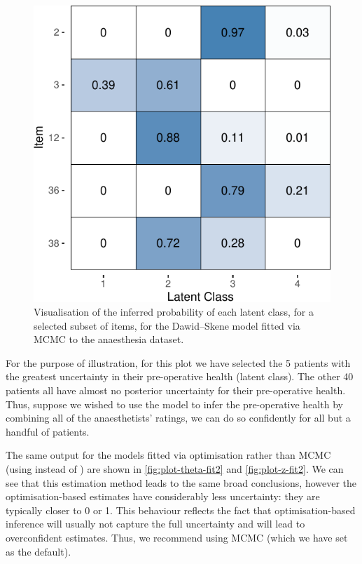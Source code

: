 \begin{figure}

{\centering \includegraphics{rater_files/figure-latex/plot-z-1} 

}

\caption{Visualisation of the inferred probability of each latent class, for a selected subset of items, for the Dawid--Skene model fitted via MCMC to the anaesthesia dataset.}\label{fig:plot-z}
\end{figure}

For the purpose of illustration, for this plot we have selected the 5 patients
with the greatest uncertainty in their pre-operative health (latent class). The
other 40 patients all have almost no posterior uncertainty for their
pre-operative health. Thus, suppose we wished to use the model to infer the
pre-operative health by combining all of the anaesthetists' ratings, we can do
so confidently for all but a handful of patients.

The same output for the models fitted via
optimisation rather than MCMC (using  instead of ) are
shown in \autoref{fig:plot-theta-fit2} and \autoref{fig:plot-z-fit2}. We can
see that this estimation method leads to the same broad conclusions, however the
optimisation-based estimates have considerably less uncertainty: they are
typically closer to 0 or 1. This behaviour reflects the fact that
optimisation-based inference will usually not capture the full uncertainty and
will lead to overconfident estimates. Thus, we recommend using MCMC (which we
have set as the default).

